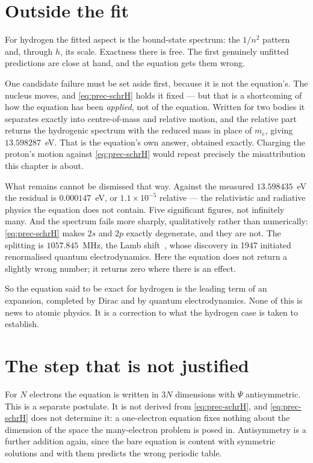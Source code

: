 \section{Outside the fit}\label{sec:prec-outside}

For hydrogen the fitted aspect is the bound-state spectrum: the $1/n^2$ pattern and, through $h$,
its scale. Exactness there is free. The first genuinely unfitted predictions are close at hand, and
the equation gets them wrong.

One candidate failure must be set aside first, because it is not the equation's. The nucleus moves,
and \eqref{eq:prec-schrH} holds it fixed --- but that is a shortcoming of how the equation has been
\emph{applied}, not of the equation. Written for two bodies it separates exactly into
centre-of-mass and relative motion, and the relative part returns the hydrogenic spectrum with the
reduced mass in place of $m_e$, giving $13.598287$~eV. That is the equation's own answer, obtained
exactly. Charging the proton's motion against \eqref{eq:prec-schrH} would repeat precisely the
misattribution this chapter is about.

What remains cannot be dismissed that way. Against the measured $13.598435$~eV the residual is
$0.000147$~eV, or $1.1\times10^{-5}$ relative --- the relativistic and radiative physics the
equation does not contain. Five significant figures, not infinitely many. And the spectrum fails
more sharply, qualitatively rather than numerically: \eqref{eq:prec-schrH} makes $2s$ and $2p$
exactly degenerate, and they are not. The splitting is $1057.845$~MHz, the Lamb
shift~\cite{LambRetherford}, whose discovery in 1947 initiated renormalised quantum
electrodynamics. Here the equation does not return
a slightly wrong number; it returns zero where there is an effect.

So the equation said to be exact for hydrogen is the leading term of an expansion, completed by
Dirac and by quantum electrodynamics. None of this is news to atomic physics. It is a correction to
what the hydrogen case is taken to establish.

\section{The step that is not justified}\label{sec:prec-step}

For $N$ electrons the equation is written in $3N$ dimensions with $\Psi$ antisymmetric. This is a
separate postulate. It is not derived from \eqref{eq:prec-schrH}, and \eqref{eq:prec-schrH} does not
determine it: a one-electron equation fixes nothing about the dimension of the space the
many-electron problem is posed in. Antisymmetry is a further addition again, since the bare
equation is content with symmetric solutions and with them predicts the wrong periodic table.

